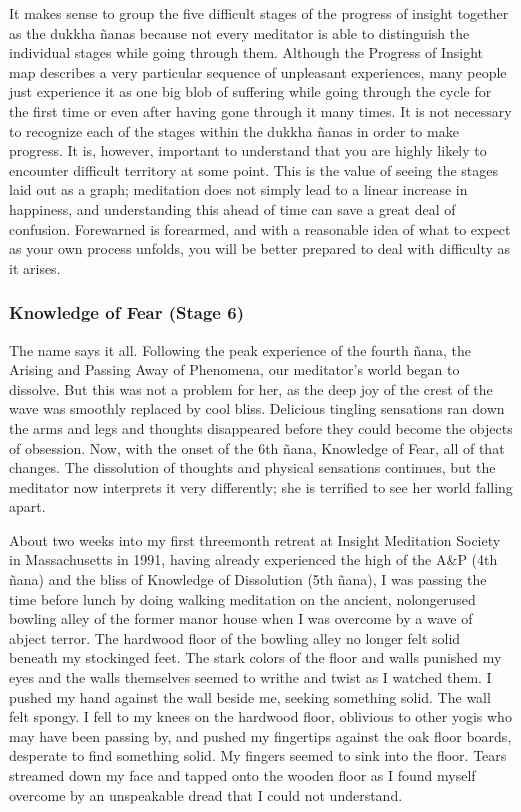 \documentclass[a5paper,10pt,english]{book}
\begin{document}
\sphinxAtStartPar
It makes sense to group the five difficult stages of the progress of
insight together as the dukkha ñanas because not every meditator is able
to distinguish the individual stages while going through them. Although
the Progress of Insight map describes a very particular sequence of
unpleasant experiences, many people just experience it as one big blob
of suffering while going through the cycle for the first time or even
after having gone through it many times. It is not necessary to
recognize each of the stages within the dukkha ñanas in order to make
progress. It is, however, important to understand that you are highly
likely to encounter difficult territory at some point. This is the value
of seeing the stages laid out as a graph; meditation does not simply
lead to a linear increase in happiness, and understanding this ahead of
time can save a great deal of confusion. Forewarned is forearmed, and
with a reasonable idea of what to expect as your own process unfolds,
you will be better prepared to deal with difficulty as it arises.


\subsubsection{Knowledge of Fear (Stage 6)}
\label{\detokenize{main-2:knowledge-of-fear-stage-6}}
\sphinxAtStartPar
The name says it all. Following the peak experience of the fourth ñana,
the Arising and Passing Away of Phenomena, our meditator’s world began
to dissolve. But this was not a problem for her, as the deep joy of the
crest of the wave was smoothly replaced by cool bliss. Delicious
tingling sensations ran down the arms and legs and thoughts disappeared
before they could become the objects of obsession. Now, with the onset
of the 6th ñana, Knowledge of Fear, all of that changes. The dissolution
of thoughts and physical sensations continues, but the meditator now
interprets it very differently; she is terrified to see her world
falling apart.

\sphinxAtStartPar
About two weeks into my first three\sphinxhyphen{}month retreat at Insight Meditation
Society in Massachusetts in 1991, having already experienced the high of
the A\&P (4th ñana) and the bliss of Knowledge of Dissolution (5th ñana),
I was passing the time before lunch by doing walking meditation on the
ancient, no\sphinxhyphen{}longer\sphinxhyphen{}used bowling alley of the former manor house when I
was overcome by a wave of abject terror. The hardwood floor of the
bowling alley no longer felt solid beneath my stockinged feet. The stark
colors of the floor and walls punished my eyes and the walls themselves
seemed to writhe and twist as I watched them. I pushed my hand against
the wall beside me, seeking something solid. The wall felt spongy. I
fell to my knees on the hardwood floor, oblivious to other yogis who may
have been passing by, and pushed my fingertips against the oak floor
boards, desperate to find something solid. My fingers seemed to sink
into the floor. Tears streamed down my face and tapped onto the wooden
floor as I found myself overcome by an unspeakable dread that I could
not understand.
\end{document}
